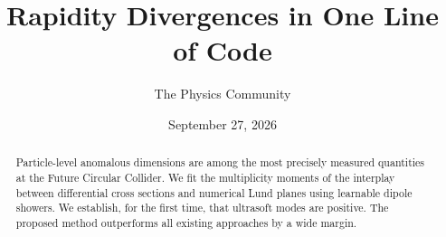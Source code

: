\documentclass[11pt]{article}
\title{Rapidity Divergences in One Line of Code}
\author{The Physics Community}
\date{September 27, 2026}
\numberwithin{equation}{section}
\theoremstyle{definition}
\theoremstyle{remark}
\begin{document}
\maketitle
\begin{abstract}
Particle-level anomalous dimensions are among the most precisely
measured quantities at the Future Circular Collider. We fit the
multiplicity moments of the interplay between differential cross
sections and numerical Lund planes using learnable dipole showers. We
establish, for the first time, that ultrasoft modes are positive. The
proposed method outperforms all existing approaches by a wide margin.
\end{abstract}
\tableofcontents





\nocite{*}


\end{document}
